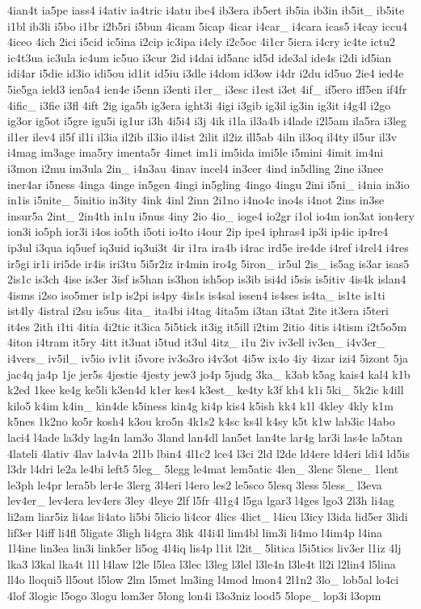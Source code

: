 {4ian4t ia5pe iass4 i4ativ ia4tric i4atu ibe4 ib3era ib5ert ib5ia ib3in ib5it\-\_\- ib5ite i1bl ib3li i5bo i1br i2b5ri i5bun 4icam 5icap 4icar i4car\-\_\- i4cara icas5 i4cay iccu4 4iceo 4ich 2ici i5cid ic5ina i2cip ic3ipa i4cly i2c5oc 4i1cr 5icra i4cry ic4te ictu2 ic4t3ua ic3ula ic4um ic5uo i3cur 2id i4dai id5anc id5d ide3al ide4s i2di id5ian idi4ar i5die id3io idi5ou id1it id5iu i3dle i4dom id3ow i4dr i2du id5uo 2ie4 ied4e 5ie5ga ield3 ien5a4 ien4e i5enn i3enti i1er\-\_\- i3esc i1est i3et 4if\-\_\- if5ero iff5en if4fr 4ific\-\_\- i3fie i3fl 4ift 2ig iga5b ig3era ight3i 4igi i3gib ig3il ig3in ig3it i4g4l i2go ig3or ig5ot i5gre igu5i ig1ur i3h 4i5i4 i3j 4ik i1la il3a4b i4lade i2l5am ila5ra i3leg il1er ilev4 il5f il1i il3ia il2ib il3io il4ist 2ilit il2iz ill5ab 4iln il3oq il4ty il5ur il3v i4mag im3age ima5ry imenta5r 4imet im1i im5ida imi5le i5mini 4imit im4ni i3mon i2mu im3ula 2in\-\_\- i4n3au 4inav incel4 in3cer 4ind in5dling 2ine i3nee iner4ar i5ness 4inga 4inge in5gen 4ingi in5gling 4ingo 4ingu 2ini i5ni\-\_\- i4nia in3io in1is i5nite\-\_\- 5initio in3ity 4ink 4inl 2inn 2i1no i4no4c ino4s i4not 2ins in3se insur5a 2int\-\_\- 2in4th in1u i5nus 4iny 2io 4io\-\_\- ioge4 io2gr i1ol io4m ion3at ion4ery ion3i io5ph ior3i i4os io5th i5oti io4to i4our 2ip ipe4 iphras4 ip3i ip4ic ip4re4 ip3ul i3qua iq5uef iq3uid iq3ui3t 4ir i1ra ira4b i4rac ird5e ire4de i4ref i4rel4 i4res ir5gi ir1i iri5de ir4is iri3tu 5i5r2iz ir4min iro4g 5iron\-\_\- ir5ul 2is\-\_\- is5ag is3ar isas5 2is1c is3ch 4ise is3er 3isf is5han is3hon ish5op is3ib isi4d i5sis is5itiv 4is4k islan4 4isms i2so iso5mer is1p is2pi is4py 4is1s is4sal issen4 is4ses is4ta\-\_\- is1te is1ti ist4ly 4istral i2su is5us 4ita\-\_\- ita4bi i4tag 4ita5m i3tan i3tat 2ite it3era i5teri it4es 2ith i1ti 4itia 4i2tic it3ica 5i5tick it3ig it5ill i2tim 2itio 4itis i4tism i2t5o5m 4iton i4tram it5ry 4itt it3uat i5tud it3ul 4itz\-\_\- i1u 2iv iv3ell iv3en\-\_\- i4v3er\-\_\- i4vers\-\_\- iv5il\-\_\- iv5io iv1it i5vore iv3o3ro i4v3ot 4i5w ix4o 4iy 4izar izi4 5izont 5ja jac4q ja4p 1je jer5s 4jestie 4jesty jew3 jo4p 5judg 3ka\-\_\- k3ab k5ag kais4 kal4 k1b k2ed 1kee ke4g ke5li k3en4d k1er kes4 k3est\-\_\- ke4ty k3f kh4 k1i 5ki\-\_\- 5k2ic k4ill kilo5 k4im k4in\-\_\- kin4de k5iness kin4g ki4p kis4 k5ish kk4 k1l 4kley 4kly k1m k5nes 1k2no ko5r kosh4 k3ou kro5n 4k1s2 k4sc ks4l k4sy k5t k1w lab3ic l4abo laci4 l4ade la3dy lag4n lam3o 3land lan4dl lan5et lan4te lar4g lar3i las4e la5tan 4lateli 4lativ 4lav la4v4a 2l1b lbin4 4l1c2 lce4 l3ci 2ld l2de ld4ere ld4eri ldi4 ld5is l3dr l4dri le2a le4bi left5 5leg\-\_\- 5legg le4mat lem5atic 4len\-\_\- 3lenc 5lene\-\_\- 1lent le3ph le4pr lera5b ler4e 3lerg 3l4eri l4ero les2 le5sco 5lesq 3less 5less\-\_\- l3eva lev4er\-\_\- lev4era lev4ers 3ley 4leye 2lf l5fr 4l1g4 l5ga lgar3 l4ges lgo3 2l3h li4ag li2am liar5iz li4as li4ato li5bi 5licio li4cor 4lics 4lict\-\_\- l4icu l3icy l3ida lid5er 3lidi lif3er l4iff li4fl 5ligate 3ligh li4gra 3lik 4l4i4l lim4bl lim3i li4mo l4im4p l4ina 1l4ine lin3ea lin3i link5er li5og 4l4iq lis4p l1it l2it\-\_\- 5litica l5i5tics liv3er l1iz 4lj lka3 l3kal lka4t l1l l4law l2le l5lea l3lec l3leg l3lel l3le4n l3le4t ll2i l2lin4 l5lina ll4o lloqui5 ll5out l5low 2lm l5met lm3ing l4mod lmon4 2l1n2 3lo\-\_\- lob5al lo4ci 4lof 3logic l5ogo 3logu lom3er 5long lon4i l3o3niz lood5 5lope\-\_\- lop3i l3opm }
